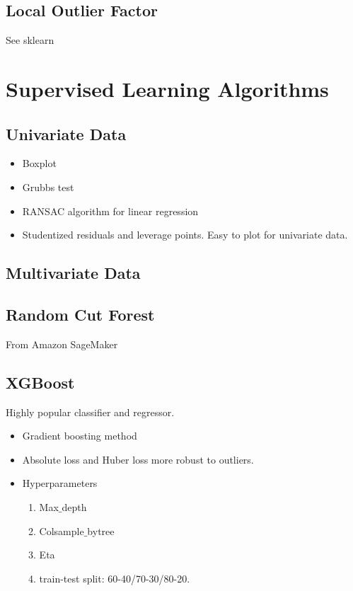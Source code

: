 \documentclass[a4paper, 12pt]{report}
\begin{document}
\section{Local Outlier Factor}
See sklearn


\chapter{Supervised Learning Algorithms}

\section{Univariate Data}
\begin{itemize}
\item Boxplot
\item Grubbs test
\item RANSAC algorithm for linear regression
\item Studentized residuals and leverage points. Easy to plot for univariate data.
\end{itemize}

\section{Multivariate Data}

\section{Random Cut Forest}
From Amazon SageMaker

\section{XGBoost}
Highly popular classifier and regressor. 
\begin{itemize}
\item Gradient boosting method
\item Absolute loss and Huber loss more robust to outliers.
\item Hyperparameters
\begin{enumerate}
\item Max$\_$depth
\item Colsample$\_$bytree
\item Eta
\item train-test split: 60-40/70-30/80-20.
\end{enumerate}
\end{itemize}
\end{document}
